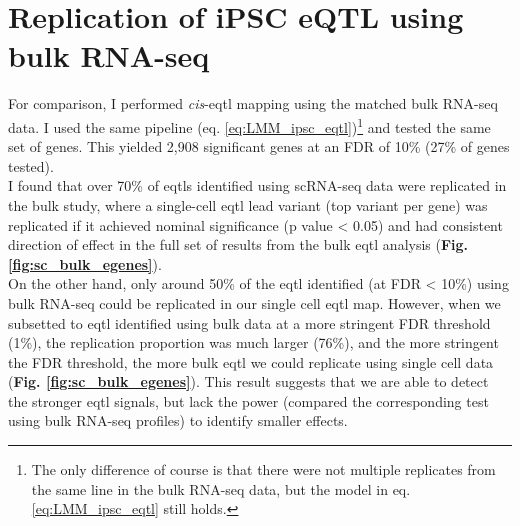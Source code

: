 \newpage

\section{Replication of iPSC eQTL using bulk RNA-seq}

For comparison, I performed \textit{cis}-\gls{eqtl} mapping using the matched bulk RNA-seq data.
I used the same pipeline (eq. \eqref{eq:LMM_ipsc_eqtl})\footnote{The only difference of course is that there were not multiple replicates from the same line in the bulk RNA-seq data, but the model in eq. \eqref{eq:LMM_ipsc_eqtl} still holds.} 
and tested the same set of genes. 
This yielded 2,908 significant genes at an FDR of 10\%
(27\% of genes tested). \\

I found that over 70\% of \glspl{eqtl} identified using scRNA-seq data were replicated in the bulk study, where a single-cell \gls{eqtl} lead variant (top variant per gene) was replicated if it achieved nominal significance (p value < 0.05) and had consistent direction of effect in the full set of results from the bulk \gls{eqtl} analysis (\textbf{Fig. \ref{fig:sc_bulk_egenes}}). \\

On the other hand, only around 50\% of the \gls{eqtl} identified (at FDR < 10\%) using bulk RNA-seq could be replicated
in our single cell \gls{eqtl} map.
However, when we subsetted to \gls{eqtl} identified using bulk data at a more stringent FDR threshold (1\%), the replication proportion was much larger (76\%), and the more stringent the FDR threshold, the more bulk \gls{eqtl} we could replicate using single cell data (\textbf{Fig. \ref{fig:sc_bulk_egenes}}).
This result suggests that we are able to detect the stronger \gls{eqtl} signals, but lack the power (compared the corresponding test using bulk RNA-seq profiles) to identify smaller effects.

